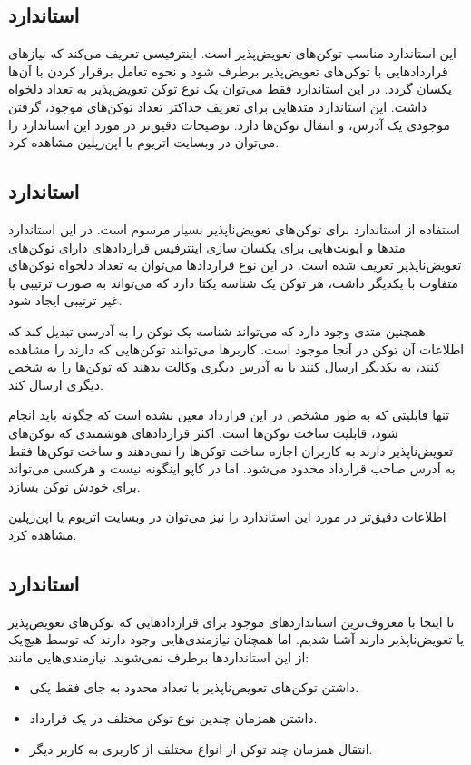 \subsection{استاندارد }
این استاندارد مناسب توکن‌های تعویض‌پذیر است.
اینترفیسی تعریف می‌کند که نیازهای قراردادهایی با توکن‌های تعویض‌پذیر برطرف شود
و نحوه تعامل برقرار کردن با آن‌ها یکسان گردد.
در این استاندارد فقط می‌توان یک نوع توکن تعویض‌پذیر به تعداد دلخواه داشت.
این استاندارد متدهایی برای تعریف حداکثر تعداد توکن‌های موجود،
گرفتن موجودی یک آدرس، و انتقال توکن‌ها دارد. توضیحات دقیق‌تر در مورد این استاندارد را می‌توان در وبسایت
اتریوم
یا اپن‌زپلین
مشاهده کرد.

\subsection{استاندارد }
استفاده از استاندارد
برای توکن‌های تعویض‌ناپذیر بسیار مرسوم است.
در این استاندارد متدها و ایونت‌هایی برای یکسان سازی اینترفیس قراردادهای دارای توکن‌های تعویض‌ناپذیر تعریف شده است.
در این نوع قرارداد‌ها می‌توان به تعداد دلخواه توکن‌های متفاوت با یکدیگر داشت،
هر توکن یک شناسه یکتا دارد که می‌تواند به صورت ترتیبی یا غیر ترتیبی ایجاد شود.

همچنین متدی وجود دارد که می‌تواند شناسه یک توکن را به آدرسی تبدیل کند که اطلاعات آن توکن در آنجا موجود است.
کاربرها می‌توانند توکن‌هایی که دارند را مشاهده کنند،
به یکدیگر ارسال کنند یا به آدرس دیگری وکالت بدهند که توکن‌ها را به شخص دیگری ارسال کند.

تنها قابلیتی که به طور مشخص در این قرارداد معین نشده است که چگونه باید انجام شود،
قابلیت ساخت توکن‌ها است.
اکثر قراردادهای هوشمندی که توکن‌های تعویض‌ناپذیر دارند به کاربران اجازه ساخت توکن‌ها را نمی‌دهند
و ساخت توکن‌ها فقط به آدرس صاحب قرارداد محدود می‌شود.
اما در کاپو اینگونه نیست و هرکسی می‌تواند برای خودش توکن بسازد.

اطلاعات دقیق‌تر در مورد این استاندارد را نیز می‌توان در وبسایت
اتریوم
یا
اپن‌زپلین
مشاهده کرد.


\subsection{استاندارد }
تا اینجا با معروف‌ترین استاندارد‌های موجود برای قراردادهایی که توکن‌های تعویض‌پذیر یا تعویض‌ناپذیر دارند آشنا شدیم.
اما همچنان نیازمندی‌هایی وجود دارند که توسط هیچ‌یک از این استانداردها برطرف نمی‌شوند. نیازمندی‌هایی مانند:
\begin{itemize}
	\item
داشتن توکن‌های تعویض‌ناپذیر با تعداد محدود به جای فقط یکی.
	\item
داشتن همزمان چندین نوع توکن مختلف در یک قرارداد.
	\item
انتقال همزمان چند توکن از انواع مختلف از کاربری به کاربر دیگر.
\end{itemize}

